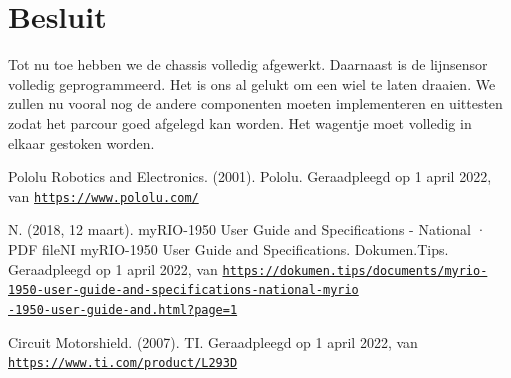 \documentclass[kulak]{kulakarticle} %
\begin{document}
\section*{Besluit}
Tot nu toe hebben we de chassis volledig afgewerkt. Daarnaast is de lijnsensor  volledig geprogrammeerd. Het is ons al gelukt om een wiel te laten draaien. We zullen nu vooral nog de andere componenten moeten implementeren en uittesten zodat het parcour goed afgelegd kan worden. Het wagentje moet volledig in elkaar gestoken worden.  
\begin{thebibliography}{9}
	
	 Pololu Robotics and Electronics. (2001). Pololu. Geraadpleegd op 1 april 2022, van  \href{https://www.pololu.com/}{\texttt{https://www.pololu.com/}}
	
	 N. (2018, 12 maart). myRIO-1950 User Guide and Specifications - National · PDF fileNI myRIO-1950 User Guide and Specifications. Dokumen.Tips. Geraadpleegd op 1 april 2022, van \href{https://dokumen.tips/documents/myrio-1950-user-guide-and-specifications-national-myrio-1950-user-guide-and.html?page=1} {\texttt{https://dokumen.tips/documents/myrio-1950-user-guide-and-specifications-national-myrio\\-1950-user-guide-and.html?page=1}}
	
	
	Circuit Motorshield. (2007). TI. Geraadpleegd op 1 april 2022, van  \href{https://www.ti.com/product/L293D}{\texttt{https://www.ti.com/product/L293D}}


	
\end{thebibliography}


\end{document}
